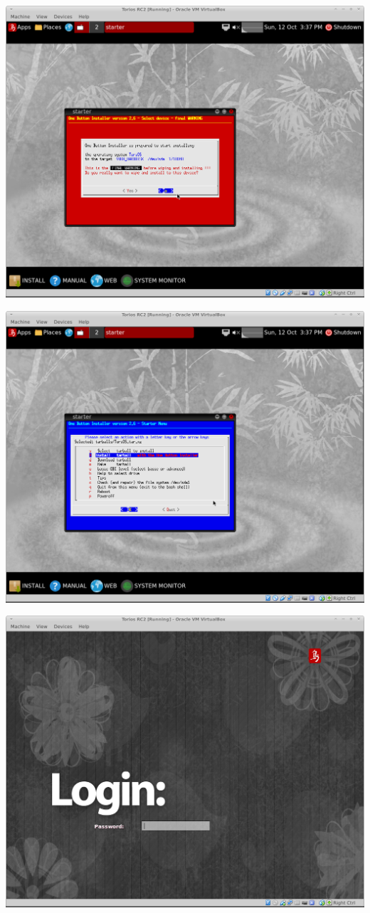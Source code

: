 \documentclass[12pt,a4paper]{book}
\begin{document}
\includegraphics[width=0.7\linewidth]{torios-rc2-install8-final-warning}

\includegraphics[width=0.7\linewidth]{torios-rc2-install9}




\includegraphics[width=0.7\linewidth]{screen-shots/torios-rc2-login-screen}
\end{document}
